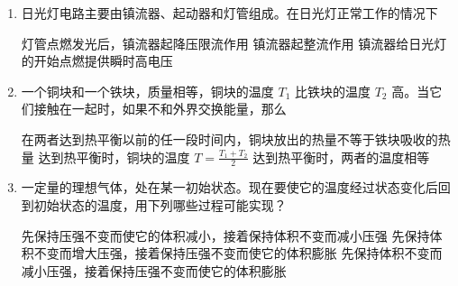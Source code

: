 \documentclass[\gkver]{gaokaozhenti}
\begin{document}
\begin{enumerate}
{评分说明：全题 15 分，每小题 3 分。
}

\item
日光灯电路主要由镇流器、起动器和灯管组成。在日光灯正常工作的情况下

{灯管点燃发光后，镇流器起降压限流作用}
{镇流器起整流作用}
{镇流器给日光灯的开始点燃提供瞬时高电压}


\item
一个铜块和一个铁块，质量相等，铜块的温度 $T_{1}$ 比铁块的温度 $T_{2}$ 高。当它们接触在一起时，如果不和外界交换能量，那么

{在两者达到热平衡以前的任一段时间内，铜块放出的热量不等于铁块吸收的热量}
{达到热平衡时，铜块的温度 $T = \frac{T_{1} + T_{2}}{2}$}
{达到热平衡时，两者的温度相等}


\item
一定量的理想气体，处在某一初始状态。现在要使它的温度经过状态变化后回到初始状态的温度，用下列哪些过程可能实现？

{先保持压强不变而使它的体积减小，接着保持体积不变而减小压强}
{先保持体积不变而增大压强，接着保持压强不变而使它的体积膨胀}
{先保持体积不变而减小压强，接着保持压强不变而使它的体积膨胀}


\end{enumerate}
\end{document}
